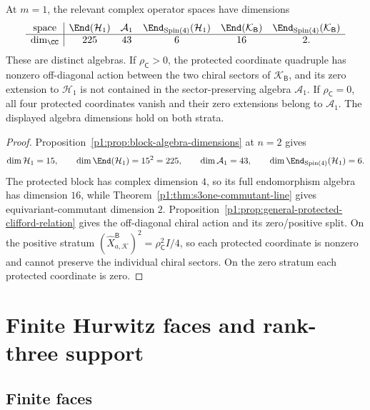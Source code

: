 \documentclass[11pt]{article}
\begin{document}
\begin{corollary}
\label{p1:cor:level-one-operator-algebra-dimensions}
At \(m=1\), the relevant complex operator spaces have dimensions
\[
\begin{array}{c|ccccc}
\text{space}
&\End(\mathcal H_1)
&\mathcal A_1
&\End_{\operatorname{Spin}(4)}(\mathcal H_1)
&\End(\mathcal K_{\mathsf B})
&\End_{\operatorname{Spin}(4)}(\mathcal K_{\mathsf B})\\
\hline
\dim_\CC&225&43&6&16&2.
\end{array}
\]
These are distinct algebras.  If \(\rho_{\mathsf C}>0\), the protected
coordinate quadruple has nonzero off-diagonal action between the two chiral
sectors of \(\mathcal K_{\mathsf B}\), and its zero extension to
\(\mathcal H_1\) is not contained in the sector-preserving algebra
\(\mathcal A_1\).  If \(\rho_{\mathsf C}=0\), all four protected
coordinates vanish and their zero extensions belong to \(\mathcal A_1\).
The displayed algebra dimensions hold on both strata.
\end{corollary}

\begin{proof}
Proposition~\ref{p1:prop:block-algebra-dimensions} at \(n=2\) gives
\[
\dim\mathcal H_1=15,\qquad
\dim\End(\mathcal H_1)=15^2=225,\qquad
\dim\mathcal A_1=43,\qquad
\dim\End_{\operatorname{Spin}(4)}(\mathcal H_1)=6.
\]
The protected block has complex dimension \(4\), so its full endomorphism
algebra has dimension \(16\), while
Theorem~\ref{p1:thm:s3one-commutant-line} gives equivariant-commutant
dimension \(2\).  Proposition~\ref{p1:prop:general-protected-clifford-relation}
gives the off-diagonal chiral action and its zero/positive split.  On the
positive stratum \((\widehat X_{a,\mathcal K}^{\mathsf B})^2=\rho_{\mathsf C}^2I/4\), so each
protected coordinate is nonzero and cannot preserve the individual chiral
sectors.  On the zero stratum each protected coordinate is zero.
\end{proof}




\section{Finite Hurwitz faces and rank-three support}
\label{p1:sec:finite-hurwitz-faces-rank-three-support}

\subsection{Finite faces}
\end{document}
